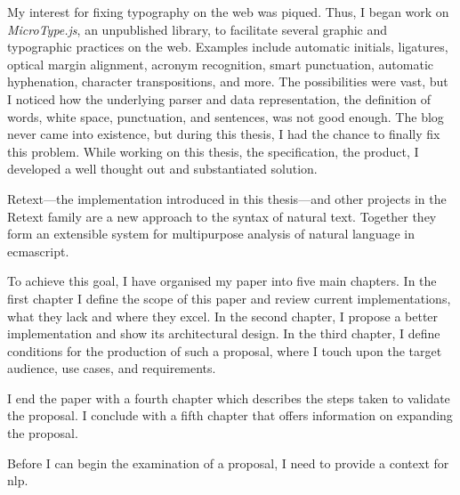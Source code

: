 My interest for fixing typography on the web was piqued.
Thus, I began work on \emph{MicroType.js}, an unpublished library, to
  facilitate several graphic and typographic practices on the web.
Examples include automatic initials, ligatures, optical margin alignment,
  acronym recognition, smart punctuation, automatic hyphenation, character
  transpositions, and more.
The possibilities were vast, but I noticed how the underlying parser and data
  representation, the definition of words, white space, punctuation, and
  sentences, was not good enough.
The blog never came into existence, but during this thesis, I had the chance
  to finally fix this problem.
While working on this thesis, the specification, the product, I developed a
  well thought out and substantiated solution.

Retext---the implementation introduced in this thesis---and other projects
in the Retext family are a new approach to the syntax of natural text.
Together they form an extensible system for multipurpose analysis of natural
language in \gls{ecmascript}.

To achieve this goal, I have organised my paper into five main chapters. In
the first chapter I define the scope of this paper and review current
implementations, what they lack and where they excel. In the second
chapter, I propose a better implementation and show its architectural
design. In the third chapter, I define conditions for the production of
such a proposal, where I touch upon the target audience, use cases, and
requirements.

I end the paper with a fourth chapter which describes the steps taken to
validate the proposal. I conclude with a fifth chapter that offers
information on expanding the proposal.

Before I can begin the examination of a proposal, I need to provide a
context for \gls{nlp}.

\endgroup
